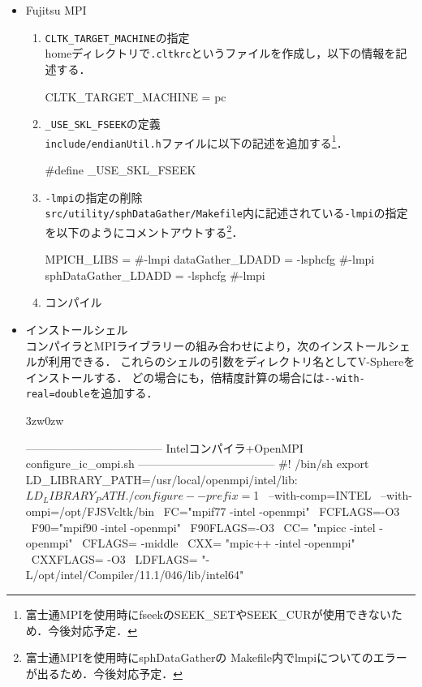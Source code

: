 \begin{itemize}
%
\item Fujitsu MPI\\
\begin{enumerate}
\item \verb|CLTK_TARGET_MACHINE|の指定\\
homeディレクトリで\verb|.cltkrc|というファイルを作成し，以下の情報を記述する．
{ \small
\begin{program}
CLTK_TARGET_MACHINE = pc
\end{program}}
\vspace{2mm}

\item \verb|_USE_SKL_FSEEK|の定義\\
\verb|include/endianUtil.h|ファイルに以下の記述を追加する\footnote{富士通MPIを使用時にfseekのSEEK\_SETやSEEK\_CURが使用できないため．今後対応予定．}．
{ \small
\begin{program}
#define _USE_SKL_FSEEK
\end{program}}
\vspace{2mm}

\item \verb|-lmpi|の指定の削除\\
\verb|src/utility/sphDataGather/Makefile|内に記述されている\verb|-lmpi|の指定を以下のようにコメントアウトする\footnote{富士通MPIを使用時にsphDataGatherの Makefile内でlmpiについてのエラーが出るため．今後対応予定．}．
{ \small
\begin{program}
MPICH_LIBS = #-lmpi
dataGather_LDADD = -lsphcfg #-lmpi 
sphDataGather_LDADD = -lsphcfg #-lmpi
\end{program}}
\vspace{2mm}

\item コンパイル\\
{ \small
{}}
\end{enumerate}

%
\item インストールシェル\\
コンパイラとMPIライブラリーの組み合わせにより，次のインストールシェルが利用できる．
これらのシェルの引数をディレクトリ名としてV-Sphereをインストールする．
どの場合にも，倍精度計算の場合には\verb|--with-real=double|を追加する．
\begin{indentation}{3zw}{0zw}
\small
\begin{program}
------------------------------------
Intelコンパイラ+OpenMPI  configure_ic_ompi.sh
------------------------------------
#! /bin/sh
export LD_LIBRARY_PATH=/usr/local/openmpi/intel/lib:$LD_LIBRARY_PATH
 ./configure --prefix=$1 \
             --with-comp=INTEL \
             --with-ompi=/opt/FJSVcltk/bin \
             FC="mpif77 -intel -openmpi" \
             FCFLAGS=-O3 \
             F90="mpif90 -intel -openmpi" \
             F90FLAGS=-O3 \
             CC= "mpicc -intel -openmpi" \
             CFLAGS= -middle \
             CXX= "mpic++ -intel -openmpi" \
             CXXFLAGS= -O3 \
             LDFLAGS= "-L/opt/intel/Compiler/11.1/046/lib/intel64" \


\end{program}
\end{indentation}
\end{itemize}
